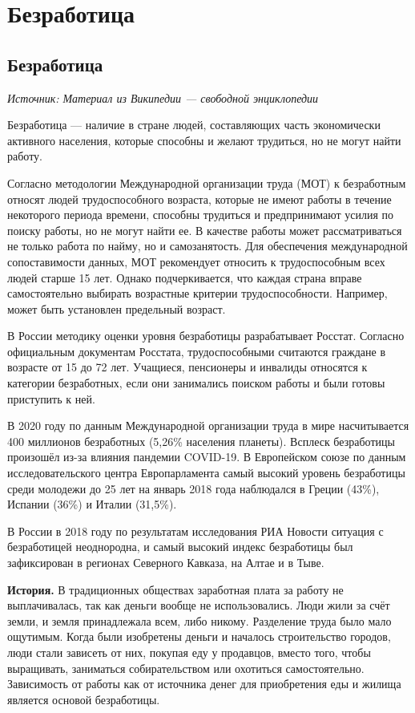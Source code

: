 \chapter{Безработица}

\section{Безработица}

\textit{Источник: Материал из Википедии — свободной энциклопедии}


Безработица — наличие в стране людей, составляющих часть экономически активного населения, которые способны и желают трудиться, но не могут найти работу.

Согласно методологии Международной организации труда (МОТ) к безработным относят людей трудоспособного возраста, которые не имеют работы в течение некоторого периода времени, способны трудиться и предпринимают усилия по поиску работы, но не могут найти ее. В качестве работы может рассматриваться не только работа по найму, но и самозанятость. Для обеспечения международной сопоставимости данных, МОТ рекомендует относить к трудоспособным всех людей старше 15 лет. Однако подчеркивается, что каждая страна вправе самостоятельно выбирать возрастные критерии трудоспособности. Например, может быть установлен предельный возраст.

В России методику оценки уровня безработицы разрабатывает Росстат. Согласно официальным документам Росстата, трудоспособными считаются граждане в возрасте от 15 до 72 лет. Учащиеся, пенсионеры и инвалиды относятся к категории безработных, если они занимались поиском работы и были готовы приступить к ней.

В 2020 году по данным Международной организации труда в мире насчитывается 400 миллионов безработных (5,26\% населения планеты). Всплеск безработицы произошёл из-за влияния пандемии COVID-19. В Европейском союзе по данным исследовательского центра Европарламента самый высокий уровень безработицы среди молодежи до 25 лет на январь 2018 года наблюдался в Греции (43\%), Испании (36\%) и Италии (31,5\%).

В России в 2018 году по результатам исследования РИА Новости ситуация с безработицей неоднородна, и самый высокий индекс безработицы был зафиксирован в регионах Северного Кавказа, на Алтае и в Тыве.

\textbf{История.} В традиционных обществах заработная плата за работу не выплачивалась, так как деньги вообще не использовались. Люди жили за счёт земли, и земля принадлежала всем, либо никому. Разделение труда было мало ощутимым. Когда были изобретены деньги и началось строительство городов, люди стали зависеть от них, покупая еду у продавцов, вместо того, чтобы выращивать, заниматься собирательством или охотиться самостоятельно. Зависимость от работы как от источника денег для приобретения еды и жилища является основой безработицы.

